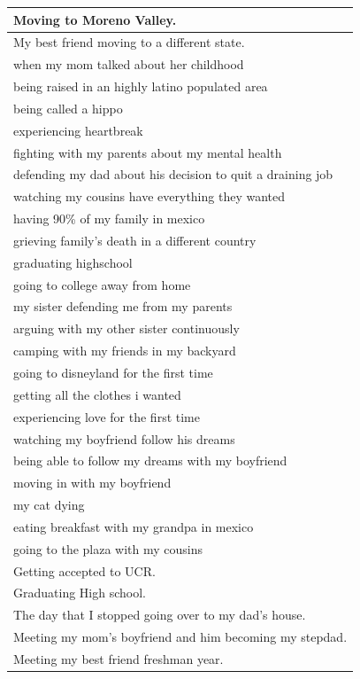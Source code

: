 \documentclass[
  .7em,
  letterpaper,
  DIV=11,
  numbers=noendperiod]{scrartcl}
\begin{document}
\begin{table}
\begin{tabular}{l}
\hline
Moving to Moreno Valley.\\
\hline
My best friend moving to a different state.\\
\hline
when my mom talked about her childhood\\
\hline
being raised in an highly latino populated area\\
\hline
being called a hippo\\
\hline
experiencing heartbreak\\
\hline
fighting with my parents about my mental health\\
\hline
defending my dad about his decision to quit a draining job\\
\hline
watching my cousins have everything they wanted\\
\hline
having 90\% of my family in mexico\\
\hline
grieving family's death in a different country\\
\hline
graduating highschool\\
\hline
going to college away from home\\
\hline
my sister defending me from my parents\\
\hline
arguing with my other sister continuously\\
\hline
camping with my friends in my backyard\\
\hline
going to disneyland for the first time\\
\hline
getting all the clothes i wanted\\
\hline
experiencing love for the first time\\
\hline
watching my boyfriend follow his dreams\\
\hline
being able to follow my dreams with my boyfriend\\
\hline
moving in with my boyfriend\\
\hline
my cat dying\\
\hline
eating breakfast with my grandpa in mexico\\
\hline
going to the plaza with my cousins\\
\hline
Getting accepted to UCR.\\
\hline
Graduating High school.\\
\hline
The day that I stopped going over to my dad's house.\\
\hline
Meeting my mom's boyfriend and him becoming my stepdad.\\
\hline
Meeting my best friend freshman year.\\
\hline

\end{tabular}
\end{table}
\end{document}
